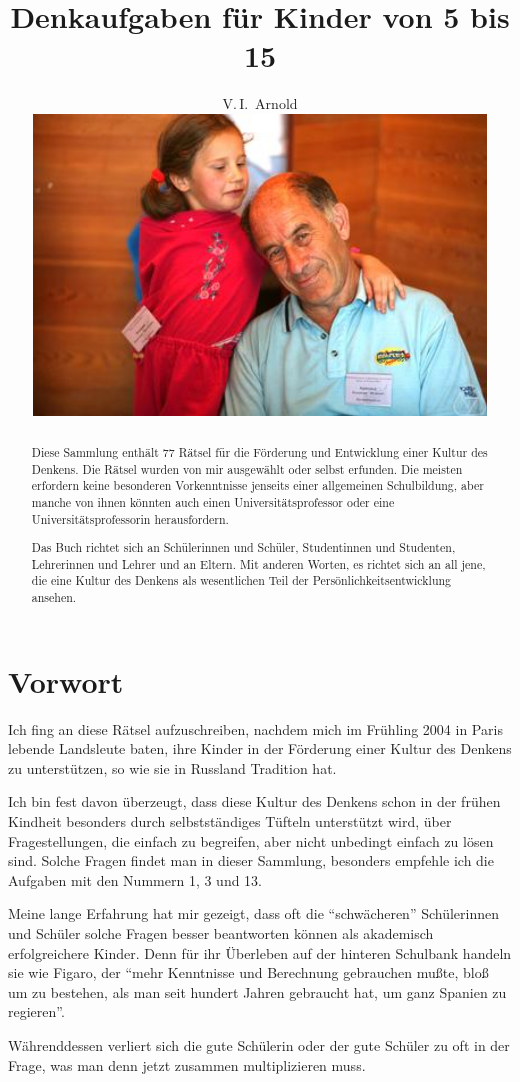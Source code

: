 \documentclass[10pt,a5paper,twoside]{article}
\title{Denkaufgaben für Kinder von 5 bis 15}
\author{V.\,I.~Arnold
\vspace*{2cm}\\ 
\includegraphics[width=12cm]{photo-arnold_small}
}
\date{}
\begin{document}


\def\eps{\varepsilon}


\begin{abstract}
\noindent Diese Sammlung enthält 77 Rätsel für die Förderung und Entwicklung einer Kultur des Denkens. Die Rätsel wurden von mir ausgewählt oder selbst erfunden. Die meisten erfordern keine besonderen Vorkenntnisse jenseits einer allgemeinen Schulbildung, aber manche von ihnen könnten auch einen Universitätsprofessor oder eine Uni\-ver\-si\-täts\-pro\-fes\-sorin herausfordern. 

Das Buch richtet sich an Schülerinnen und Schüler, Studentinnen und Studenten, Lehrerinnen und Lehrer und an Eltern. Mit anderen Worten, es richtet sich an all jene, die eine Kultur des Denkens als wesentlichen Teil der Persönlichkeitsentwicklung ansehen.
\end{abstract}
\clearpage

\section*{Vorwort}

Ich fing an diese Rätsel aufzuschreiben, nachdem mich im Frühling 2004 in Paris lebende Landsleute baten, ihre Kinder in der Förderung einer Kultur des Denkens zu unterstützen, so wie sie in Russland Tradition hat.

Ich bin fest davon überzeugt, dass diese Kultur des Denkens schon in der frühen Kindheit besonders durch selbstständiges Tüfteln unterstützt wird, über Fragestellungen, die einfach zu begreifen, aber nicht unbedingt einfach zu lösen sind. Solche Fragen findet man in dieser Sammlung, besonders empfehle ich die Aufgaben mit den Nummern 1, 3 und 13.

Meine lange Erfahrung hat mir gezeigt, dass oft die \enquote{schwächeren} Schü\-le\-rin\-nen und Schüler solche Fragen besser beantworten können als akademisch erfolgreichere Kinder. Denn für ihr Überleben auf der hinteren Schulbank handeln sie wie Figaro, der \enquote{mehr Kenntnisse und Berechnung gebrauchen mußte, bloß um zu bestehen, als man seit hundert Jahren gebraucht hat, um ganz Spanien zu regieren}.

Währenddessen verliert sich die gute Schülerin oder der gute Schüler zu oft in der Frage, was man denn jetzt zusammen multiplizieren muss. 
\end{document}
